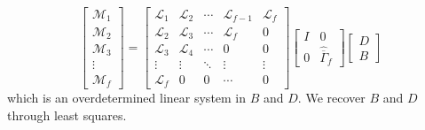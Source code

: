 \begin{equation}
\begin{bmatrix}\mathcal{M}_1\\ \mathcal{M}_2\\ \mathcal{M}_3\\ \vdots\\ \mathcal{M}_f\end{bmatrix} = 
\begin{bmatrix}
\mathcal{L}_1 & \mathcal{L}_2 & \cdots & \mathcal{L}_{f-1} & \mathcal{L}_f\\
\mathcal{L}_2 & \mathcal{L}_3 & \cdots & \mathcal{L}_{f} & 0\\
\mathcal{L}_3 & \mathcal{L}_4 & \cdots & 0 & 0\\
\vdots & \vdots & \ddots & \vdots & \vdots\\
\mathcal{L}_f & 0 & 0 & \cdots & 0
\end{bmatrix}
\begin{bmatrix}I & 0\\ 0 & \hat{\overline{\Gamma}}_f\end{bmatrix}
\begin{bmatrix}D \\ B\end{bmatrix}
\end{equation}
which is an overdetermined linear system in $B$ and $D$. We recover $B$ and $D$ through least squares.


